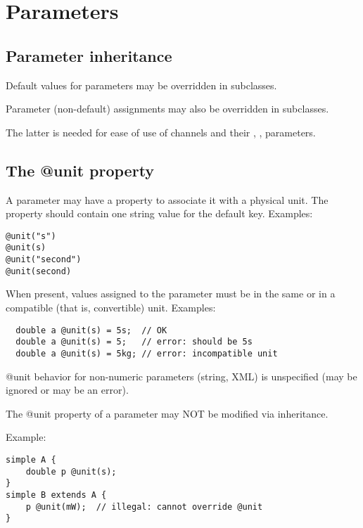 \section{Parameters}

\subsection{Parameter inheritance}

Default values for parameters may be overridden in subclasses.

Parameter (non-default) assignments may also be overridden in subclasses.

\begin{rationale}
    The latter is needed for ease of use of channels and their ,
    ,  parameters.
\end{rationale}

\subsection{The @unit property}

A parameter may have a  property to associate it with a physical
unit. The  property should contain one string value for the default
key. Examples:

\begin{verbatim}
@unit("s")
@unit(s)
@unit("second")
@unit(second)
\end{verbatim}

When present, values assigned to the parameter must be in the
same or in a compatible (that is, convertible) unit.
Examples:

\begin{verbatim}
  double a @unit(s) = 5s;  // OK
  double a @unit(s) = 5;   // error: should be 5s
  double a @unit(s) = 5kg; // error: incompatible unit
\end{verbatim}

@unit behavior for non-numeric parameters (string, XML) is unspecified
(may be ignored or may be an error).

The @unit property of a parameter may NOT be modified via inheritance.

Example:
\begin{verbatim}
simple A {
    double p @unit(s);
}
simple B extends A {
    p @unit(mW);  // illegal: cannot override @unit
}
\end{verbatim}



